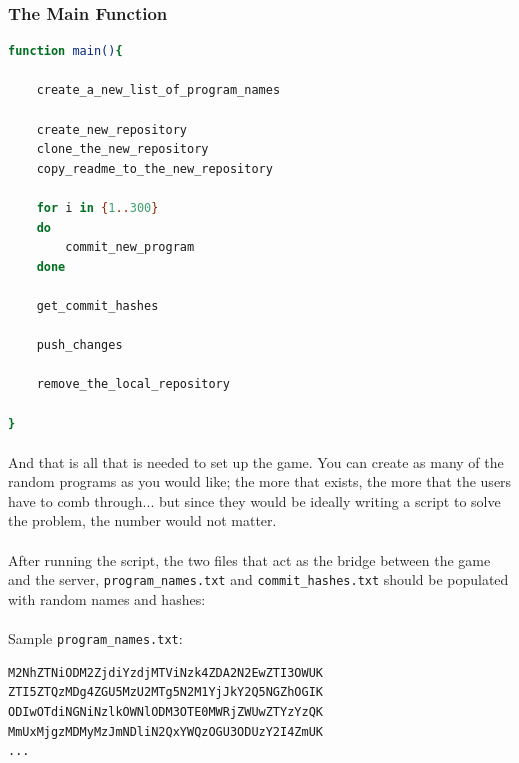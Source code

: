 \documentclass[11pt]{article}
\begin{document}
	\paragraph{}

	\hrulefill

	\newpage

	\subsubsection{The Main Function}

	\begin{lstlisting}[language=bash]
function main(){

	create_a_new_list_of_program_names

	create_new_repository
	clone_the_new_repository
	copy_readme_to_the_new_repository

	for i in {1..300}
	do
		commit_new_program
	done

	get_commit_hashes

	push_changes

	remove_the_local_repository

}
	\end{lstlisting}	

	\paragraph{} And that is all that is needed to set up the game. You can create as many of the random programs as you would like; the more that exists, the more that the users have to comb through... but since they would be ideally writing a script to solve the problem, the number would not matter.  

	\paragraph{} After running the script, the two files that act as the bridge between the game and the server, \texttt{program\_names.txt} and \texttt{commit\_hashes.txt} should be populated with random names and hashes:

	\paragraph{} Sample \texttt{program\_names.txt}:

	\begin{lstlisting}[language=bash]
M2NhZTNiODM2ZjdiYzdjMTViNzk4ZDA2N2EwZTI3OWUK
ZTI5ZTQzMDg4ZGU5MzU2MTg5N2M1YjJkY2Q5NGZhOGIK
ODIwOTdiNGNiNzlkOWNlODM3OTE0MWRjZWUwZTYzYzQK
MmUxMjgzMDMyMzJmNDliN2QxYWQzOGU3ODUzY2I4ZmUK
...
\end{lstlisting}	
\end{document}
